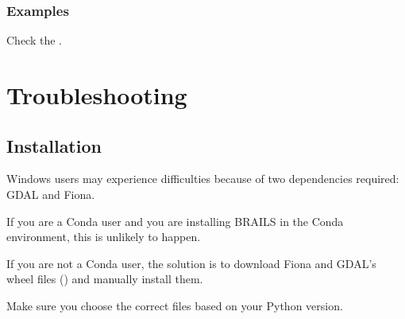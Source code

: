 \documentclass[letterpaper,10pt,english]{sphinxmanual}
\begin{document}
\subsubsection{Examples}
\label{\detokenize{common/user_manual/workflow:examples}}
\sphinxAtStartPar
Check the {\hyperref[\detokenize{common/user_manual/examples:lbl-examples}]{}}.


\section{Troubleshooting}
\label{\detokenize{common/user_manual/troubleshooting:troubleshooting}}\label{\detokenize{common/user_manual/troubleshooting:lbltroubleshooting}}\label{\detokenize{common/user_manual/troubleshooting::doc}}

\subsection{Installation}
\label{\detokenize{common/user_manual/troubleshooting:installation}}
\sphinxAtStartPar
Windows users may experience difficulties because of two dependencies required: GDAL and Fiona.

\sphinxAtStartPar
If you are a Conda user and you are installing BRAILS in the Conda environment, this is unlikely to happen.

\sphinxAtStartPar
If you are not a Conda user, the solution is to download Fiona and GDAL’s wheel
files () and manually install them.

\sphinxAtStartPar
Make sure you choose the correct files based on your Python version.
\end{document}
